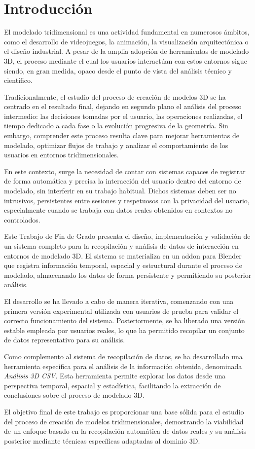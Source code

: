 \chapter{Introducción}

El modelado tridimensional es una actividad fundamental en numerosos ámbitos, como el desarrollo de videojuegos, la animación, la visualización arquitectónica o el diseño industrial. A pesar de la amplia adopción de herramientas de modelado 3D, el proceso mediante el cual los usuarios interactúan con estos entornos sigue siendo, en gran medida, opaco desde el punto de vista del análisis técnico y científico.

Tradicionalmente, el estudio del proceso de creación de modelos 3D se ha centrado en el resultado final, dejando en segundo plano el análisis del proceso intermedio: las decisiones tomadas por el usuario, las operaciones realizadas, el tiempo dedicado a cada fase o la evolución progresiva de la geometría. Sin embargo, comprender este proceso resulta clave para mejorar herramientas de modelado, optimizar flujos de trabajo y analizar el comportamiento de los usuarios en entornos tridimensionales. 

En este contexto, surge la necesidad de contar con sistemas capaces de registrar de forma automática y precisa la interacción del usuario dentro del entorno de modelado, sin interferir en su trabajo habitual. Dichos sistemas deben ser no intrusivos, persistentes entre sesiones y respetuosos con la privacidad del usuario, especialmente cuando se trabaja con datos reales obtenidos en contextos no controlados.

Este Trabajo de Fin de Grado presenta el diseño, implementación y validación de un sistema completo para la recopilación y análisis de datos de interacción en entornos de modelado 3D. El sistema se materializa en un addon para Blender que registra información temporal, espacial y estructural durante el proceso de modelado, almacenando los datos de forma persistente y permitiendo su posterior análisis.

El desarrollo se ha llevado a cabo de manera iterativa, comenzando con una primera versión experimental utilizada con usuarios de prueba para validar el correcto funcionamiento del sistema. Posteriormente, se ha liberado una versión estable empleada por usuarios reales, lo que ha permitido recopilar un conjunto de datos representativo para su análisis.

Como complemento al sistema de recopilación de datos, se ha desarrollado una herramienta específica para el análisis de la información obtenida, denominada \textit{Análisis 3D CSV}. Esta herramienta permite explorar los datos desde una perspectiva temporal, espacial y estadística, facilitando la extracción de conclusiones sobre el proceso de modelado 3D.

El objetivo final de este trabajo es proporcionar una base sólida para el estudio del proceso de creación de modelos tridimensionales, demostrando la viabilidad de un enfoque basado en la recopilación automática de datos reales y su análisis posterior mediante técnicas específicas adaptadas al dominio 3D.
